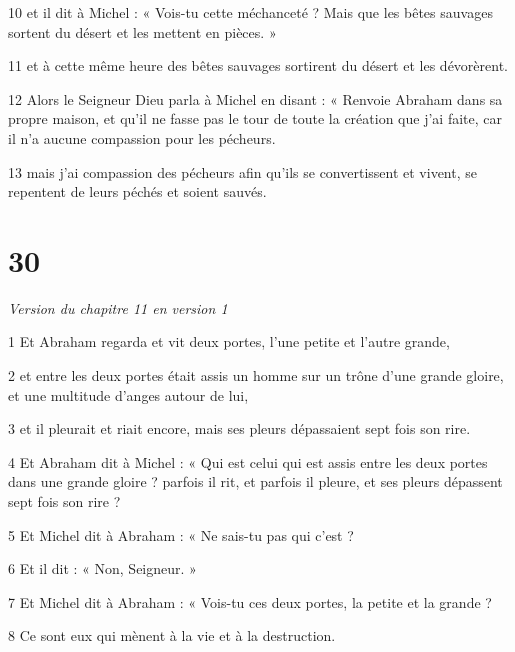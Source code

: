 \par 10 et il dit à Michel : « Vois-tu cette méchanceté ? Mais que les bêtes sauvages sortent du désert et les mettent en pièces. »

\par 11 et à cette même heure des bêtes sauvages sortirent du désert et les dévorèrent.

\par 12 Alors le Seigneur Dieu parla à Michel en disant : « Renvoie Abraham dans sa propre maison, et qu'il ne fasse pas le tour de toute la création que j'ai faite, car il n'a aucune compassion pour les pécheurs.

\par 13 mais j'ai compassion des pécheurs afin qu'ils se convertissent et vivent, se repentent de leurs péchés et soient sauvés.

\chapter{30}

\par \textit{Version du chapitre 11 en version 1}

\par 1 Et Abraham regarda et vit deux portes, l'une petite et l'autre grande,

\par 2 et entre les deux portes était assis un homme sur un trône d'une grande gloire, et une multitude d'anges autour de lui,

\par 3 et il pleurait et riait encore, mais ses pleurs dépassaient sept fois son rire.

\par 4 Et Abraham dit à Michel : « Qui est celui qui est assis entre les deux portes dans une grande gloire ? parfois il rit, et parfois il pleure, et ses pleurs dépassent sept fois son rire ?

\par 5 Et Michel dit à Abraham : « Ne sais-tu pas qui c'est ?

\par 6 Et il dit : « Non, Seigneur. »

\par 7 Et Michel dit à Abraham : « Vois-tu ces deux portes, la petite et la grande ?

\par 8 Ce sont eux qui mènent à la vie et à la destruction.

